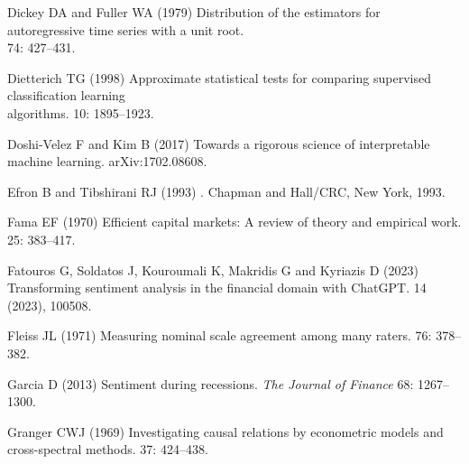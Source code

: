 \documentclass{aims}
\numberwithin{equation}{section}
\begin{document}
\begin{thebibliography}{}
\newblock Dickey DA and Fuller WA (1979)
\newblock Distribution of the estimators for autoregressive time series with a unit root.\\
 74: 427--431. 
  
\newblock  Dietterich TG (1998)
\newblock Approximate statistical tests for comparing supervised classification learning\\
algorithms.
 10: 1895--1923. 

\newblock Doshi-Velez F and Kim B (2017)
\newblock Towards a rigorous science of interpretable machine learning.
\newblock arXiv:1702.08608. 
  
\newblock Efron B and Tibshirani RJ (1993)
.
\newblock Chapman and Hall/CRC, New York, 1993. 

\newblock Fama EF (1970)
\newblock Efficient capital markets: A review of theory and empirical work.
 25: 383--417. 

\newblock Fatouros G, Soldatos J, Kouroumali K, Makridis G and Kyriazis D (2023)
\newblock Transforming sentiment analysis in the financial domain with
  {ChatGPT}.
 14 (2023), 100508. 

\newblock Fleiss JL (1971)
\newblock Measuring nominal scale agreement among many raters.
 76: 378--382. 

\newblock Garcia D (2013)
\newblock Sentiment during recessions. {\em The Journal of Finance} 68: 1267--1300.\\
\newblock  {}

\newblock Granger CWJ (1969)
\newblock Investigating causal relations by econometric models and
  cross-spectral methods.
 37: 424--438. 


\end{thebibliography}
\end{document}
